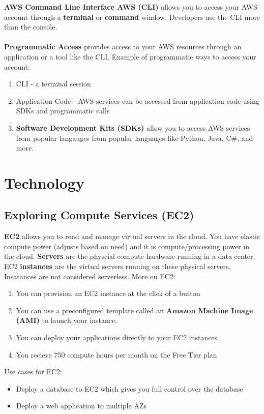 \documentclass{article}%
\begin{document}
\textbf{AWS Command Line Interface AWS (CLI) } allows you to access your AWS account through a \textbf{terminal} or \textbf{command} window. Developers use the CLI more than the console. \\ \\

\textbf{Programmatic Access} provides access to your AWS resources through an application or a tool like the CLI. Example of programmatic ways to access your account:
\begin{enumerate}
    \item CLI - a terminal session
    \item Application Code - AWS services can be accessed from application code using SDKs and programmatic calls
    \item \textbf{Software Development Kits (SDKs)} allow you to access AWS services from popular langauges from popular languages like Python, Java, C\#, and more.  
\end{enumerate}

\section{Technology}
\subsection{Exploring Compute Services (EC2)}
\textbf{EC2} allows you to rend and manage virtual servers in the cloud. You have elastic compute power (adjusts based on need) and it is compute/processing power in the cloud.
\textbf{Servers} are the physcial compute hardware running in a data center. EC2 \textbf{instances} are the virtual servers running on these physical servers. Insatances are not considered serverless.
More on EC2: 
\begin{enumerate}
    \item You can provision an EC2 instance at the click of a button
    \item You can use a preconfigured template called an \textbf{Amazon Machine Image (AMI)} to launch your instance. 
    \item You can deploy your applications directly to your EC2 instances
    \item You recieve 750 compute hours per month on the Free Tier plan
\end{enumerate}

Use cases for EC2:
\begin{itemize}
    \item Deploy a database to EC2 which gives you full control over the database
    \item Deploy a web application to multiple AZs
\end{itemize}
\end{document}
